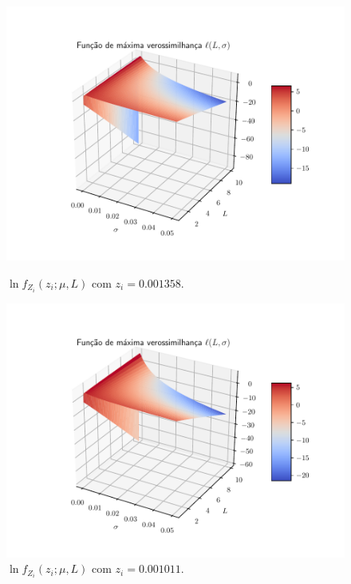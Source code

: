 \documentclass[journal,article,submit,moreauthors,pdftex]{Definitions/mdpi}
\begin{document}
\begin{figure}[hbt]
  \includegraphics[width=\linewidth]{funv_max_ver_j_70_flevoland.pdf}
  	\caption{$\ln f_{Z_{i}}(z_{i};\mu,L)$ com $z_i=0.001358 $.}\label{funv_max_ver_j_70_flevoland}
\endminipage\hfill
{}
  \includegraphics[width=\linewidth]{funv_max_ver_j_80_flevoland.pdf}
		\caption{$\ln f_{Z_{i}}(z_{i};\mu,L)$ com $z_i= 0.001011$.}\label{funv_max_ver_j_80_flevoland}
\endminipage\hfill
\end{figure}
\end{document}
